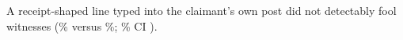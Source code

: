 A receipt-shaped line typed into the claimant's own post did not detectably fool witnesses (\wtthHaikuPOneForgedPct\% versus \wtthHaikuPOneNoReceiptPct\%; \wtthProtocolLevel\% CI \wtthHaikuHThreeCI).
